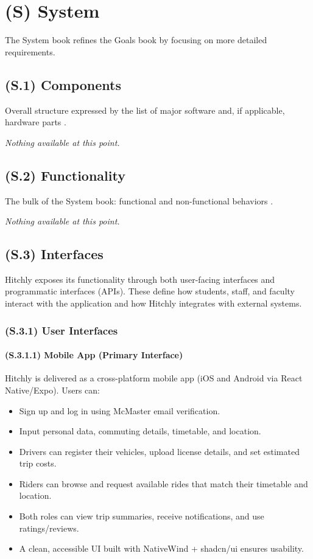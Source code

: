 \documentclass[12pt,letterpaper]{article}
\begin{document}
\section{(S) System}
The System book refines the Goals book by focusing on more detailed requirements.

\subsection{(S.1) Components}
Overall structure expressed by the list of major software and, if applicable, hardware parts \cite{meyer2022}.

\textit{Nothing available at this point.}

\subsection{(S.2) Functionality}
The bulk of the System book: functional and non-functional behaviors \cite{meyer2022}.

\textit{Nothing available at this point.}


\subsection{(S.3) Interfaces} %

Hitchly exposes its functionality through both user-facing interfaces and programmatic interfaces (APIs). These define how students, staff, and faculty interact with the application and how Hitchly integrates with external systems.

\subsubsection{(S.3.1) User Interfaces} %

\paragraph{(S.3.1.1) Mobile App (Primary Interface)} %
Hitchly is delivered as a cross-platform mobile app (iOS and Android via React Native/Expo). Users can:

\begin{itemize}
    \item Sign up and log in using McMaster email verification.
    \item Input personal data, commuting details, timetable, and location.
    \item Drivers can register their vehicles, upload license details, and set estimated trip costs.
    \item Riders can browse and request available rides that match their timetable and location.
    \item Both roles can view trip summaries, receive notifications, and use ratings/reviews.
    \item A clean, accessible UI built with NativeWind + shadcn/ui ensures usability.
\end{itemize}
\end{document}
